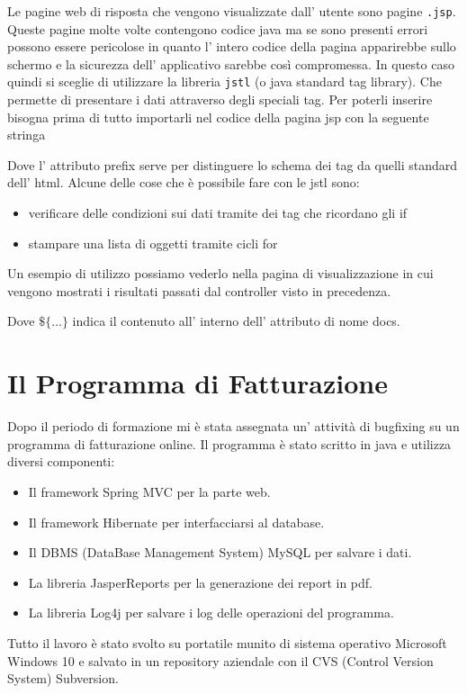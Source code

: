 \documentclass[12pt]{book}
\begin{document}
Le pagine web di risposta che vengono visualizzate dall' utente sono pagine 
\texttt{.jsp}. Queste pagine molte volte contengono codice java ma se sono 
presenti errori possono essere pericolose in quanto l' intero codice della 
pagina apparirebbe sullo schermo e la sicurezza dell' applicativo sarebbe così
compromessa.
In questo caso quindi si sceglie di utilizzare la libreria \texttt{jstl} (o java
standard tag library). Che permette di presentare i dati attraverso degli 
speciali tag.
Per poterli inserire bisogna prima di tutto importarli nel codice della
pagina jsp con la seguente stringa 

Dove l' attributo prefix serve per distinguere lo schema dei tag da quelli 
standard dell' html.
Alcune delle cose che è possibile fare con le jstl sono:
\begin{itemize}
    \item verificare delle condizioni sui dati tramite dei tag che ricordano 
        gli if 
    \item stampare una lista di oggetti tramite cicli for 
\end{itemize}
Un esempio di utilizzo possiamo vederlo nella pagina di visualizzazione 
in cui vengono mostrati i risultati passati dal controller visto in precedenza.

Dove \texttt{\(\$\{\dots\}\)} indica il contenuto all' interno dell' attributo
di nome docs.
\chapter{Il Programma di Fatturazione}
Dopo il periodo di formazione mi è stata assegnata un' attività di bugfixing 
su un programma di fatturazione online.
Il programma è stato scritto in java e utilizza diversi componenti:
\begin{itemize}
    \item Il framework Spring MVC per la parte web.
    \item Il framework Hibernate per interfacciarsi al database.
    \item Il DBMS (DataBase Management System) MySQL per salvare i dati.
    \item La libreria JasperReports per la generazione dei report in pdf.
    \item La libreria Log4j per salvare i log delle operazioni del programma.
\end{itemize}
Tutto il lavoro è stato svolto su portatile munito di sistema operativo Microsoft
Windows 10 e salvato in un repository aziendale con il CVS (Control Version 
System) Subversion\@.
\end{document}
